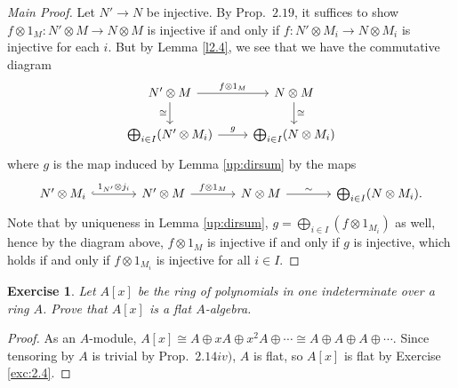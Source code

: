 \documentclass[12pt,letterpaper]{article}
\newtheorem{problem}{Exercise}[section]
\theoremstyle{definition}
\theoremstyle{remark}
\numberwithin{figure}{problem}
\numberwithin{equation}{section}
\begin{document}
\begin{proof}[Main Proof]
  Let
  $N' \to
  N$ be injective.
  By
  Prop.~$2.19$, it suffices to show
  $f \otimes 1_M\colon N' \otimes M \to N \otimes
  M$ is injective if and only if
  $f\colon N' \otimes M_i \to N \otimes
  M_i$ is injective for each
  $i$.
  But by Lemma \ref{l2.4}, we see that we have the commutative diagram
  \begin{equation*}
    \begin{tikzcd}
      N' \otimes M \rar{f \otimes 1_M} &
      N \otimes M \arrow{d}{\cong}\\
      \bigoplus_{i \in I}(N' \otimes M_i) \arrow{r}{g} \arrow[leftarrow]{u}{\cong} &
      \bigoplus_{i \in I}(N \otimes M_i)
    \end{tikzcd}
  \end{equation*}
  where
  $g$ is the map induced by Lemma \ref{up:dirsum} by the maps
  \begin{equation*}
    \begin{tikzcd}[column sep=large]
      N' \otimes M_i \rar[hook]{1_{N'} \otimes j_i} &
      N' \otimes M \rar{f \otimes 1_M} &
      N \otimes M \rar{\sim} &
      \bigoplus_{i \in I}(N \otimes M_i).
    \end{tikzcd}
  \end{equation*}
  Note that by uniqueness in Lemma \ref{up:dirsum},
  $g = \bigoplus_{i \in I} (f \otimes
  1_{M_i})$ as well, hence by the diagram above,
  $f \otimes
  1_M$ is injective if and only if
  $g$ is injective, which holds if and only if
  $f \otimes
  1_{M_i}$ is injective for all
  $i \in
  I$.
\end{proof}

\begin{problem}\label{exc:2.5}
  Let
  $A[x]$ be the ring of polynomials in one indeterminate over a ring
  $A$.
  Prove that
  $A[x]$ is a flat
  $A$-algebra.
\end{problem}
\begin{proof}
  As an
  $A$-module,
  $A[x] \cong A \oplus xA \oplus x^2A \oplus \cdots \cong A \oplus A \oplus A \oplus
  \cdots$.
  Since tensoring by
  $A$ is trivial by
  Prop.~$2.14iv)$,
  $A$ is flat, so
  $A[x]$ is flat by Exercise \ref{exc:2.4}.
\end{proof}
\end{document}
